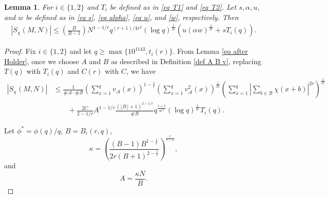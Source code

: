 \documentclass[12pt]{amsart}
\theoremstyle{plain}
\newtheorem{lemma}[theorem]{Lemma}
\theoremstyle{definition}
\newcommand{\cA}{{\mathcal{A}}}
\newcommand{\cB}{{\mathcal{B}}}
\begin{document}
\begin{lemma}\label{lemma to set up the main theorems}
For $i\in\{1, 2\}$ and $T_i$ be defined as in \eqref{eq T1} and \eqref{eq T2}. Let $s, \alpha, u, $ and $w$ be defined as in \eqref{eq s}, \eqref{eq alpha}, \eqref{eq u}, and \eqref{w}, respectively. Then
    \begin{equation*}
\begin{split}
    \left| S_\chi(M, N) \right|
    \le
    \left(\frac{B}{B-1}\right)N^{1-1/r}q^{(r+1)/{4r^2}}(\log q)^{\frac{1}{2r}}
    \left(
    u(\alpha w)^{\frac{1}{2r}}
    +sT_i(q)
    \right).
\end{split} 
\end{equation*}
\end{lemma}
\begin{proof}
    Fix $i\in \{1,2\}$ and let $q\ge \max\{10^{1143},t_i(r)\}$. From Lemma \ref{eq after Holder}, once we choose $A$ and $B$ as described in Definition \ref{def A B v}, replacing $T(q)$ with $T_i(q)$ and $C(r)$ with $C$, we have
\begin{align*} 
    \left|  S_\chi\left(M, N\right)\right|
    &\le
    \frac{1}{\#\cA\cdot \#\cB}\left(\sum_{x=1}^q v_\cA(x)\right)^{1-\frac{1}{r}}
    \left(\sum_{x=1}^q v^2_{\cA}(x)\right)^{\frac{1}{2r}}\left(\sum_{x=1}^q\left|\sum_{b \in \cB}\chi\left(x+b\right)\right|^{2r}\right)^\frac{1}{2r}
    \\
    &\qquad{}+
\frac{2C}{2-1/r} A^{1-1/r} \frac{(\lfloor B\rfloor+1)^{2-1/r}}{\#\cB} q^{\frac{r+1}{4r^2}} (\log q)^{\frac{1}{2r}} T_i(q).    \end{align*}

Let $\phi^* = \phi(q)/q$, $B = B_i(r,q)$, $$\kappa = \left(\frac{(B-1)B^{1-\frac{1}{r}}}{2r(B+1)^{2-\frac{1}{r}}}\right)^{\frac{r}{r-1}},$$
and 
$$A = \frac{\kappa N}{B}.$$


\end{proof}
\end{document}
